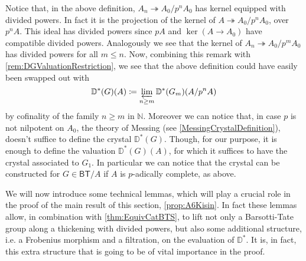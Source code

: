 \begin{rem}[]\label{rem:NonNilpotentCrystalEvaluation}
	Notice that, in the above definition, $A_n \twoheadrightarrow A_0/p^nA_0$
	has kernel equipped with divided powers.
	In fact it is the projection of the kernel of $A \twoheadrightarrow A_0/p^nA_0$, over
	$p^nA$.
	This ideal has divided powers since $pA$ and $\ker (A \to A_0)$ have compatible
	divided powers.
	Analogously we see that the kernel of $A_n \twoheadrightarrow A_0/p^mA_0$
	has divided powers for all $m \leq n$.
	Now, combining this remark with \cref{rem:DGValuationRestriction},
	we see that the above definition could have easily been swapped out with
	\begin{equation*}
		\mathbb{D}^*(G)(A) \coloneqq
		\varprojlim_{n \geq m} \mathbb{D}^*(G_m)(A/p^nA)
	\end{equation*}
	by cofinality of the family $n \geq m$ in $\mathbb{N}$.
	Moreover we can notice that, in case $p$ is not nilpotent
	on $A_0$, the theory of Messing (see \cref{MessingCrystalDefinition}),
	doesn't suffice to define the crystal $\mathbb{D}^*(G)$.
	Though, for our purpose, it is enough to define the valuation $\mathbb{D}^*(G)(A)$,
	for which it suffices to have the crystal associated to $G_1$.
	In particular we can notice that the crystal can be constructed for
	$G \in \mathsf{BT}/A$ if $A$ is $p$-adically complete, as above.
\end{rem}


\begin{rem}[]
	We will now introduce some technical lemmas, which will play a crucial role
	in the proof of the main result of this section, \cref{prop:A6Kisin}.
	In fact these lemmas allow, in combination with \cref{thm:EquivCatBTS},
	to lift not only a Barsotti-Tate group along a thickening with divided
	powers, but also some additional structure, i.e.
	a Frobenius morphism and a filtration, on the evaluation of $\mathbb{D}^*$.
	It is, in fact, this extra structure that is going to 
	be of vital importance in the proof.
\end{rem}



